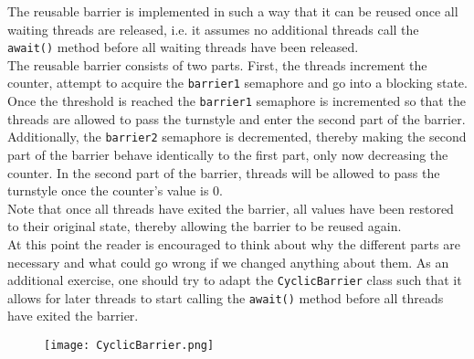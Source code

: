 \documentclass[main]{subfiles}
\begin{document}
\noindent The reusable barrier is implemented in such a way that it can be reused once all waiting threads are released, i.e. it assumes no additional threads call the \texttt{await()} method before all waiting threads have been released.\\
The reusable barrier consists of two parts. First, the threads increment the counter, attempt to acquire the \texttt{barrier1} semaphore and go into a blocking state. Once the threshold is reached the \texttt{barrier1} semaphore is incremented so that the threads are allowed to pass the turnstyle and enter the second part of the barrier. Additionally, the \texttt{barrier2} semaphore is decremented, thereby making the second part of the barrier behave identically to the first part, only now decreasing the counter. In the second part of the barrier, threads will be allowed to pass the turnstyle once the counter's value is 0.\\
Note that once all threads have exited the barrier, all values have been restored to their original state, thereby allowing the barrier to be reused again.\\[3mm]
At this point the reader is encouraged to think about why the different parts are necessary and what could go wrong if we changed anything about them. As an additional exercise, one should try to adapt the \texttt{CyclicBarrier} class such that it allows for later threads to start calling the \texttt{await()} method before all threads have exited the barrier.
\begin{figure}[H] %
    \centering
    \texttt{[image: CyclicBarrier.png]}
\end{figure}
\newpage

\end{document}
